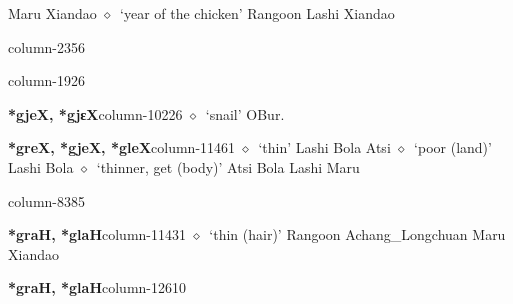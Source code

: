 \hspace{1ex}
         Maru 
\hspace{1ex}
         Xiandao 
\hspace{1ex}
         $\diamond$~`year of the chicken'
         Rangoon 
\hspace{1ex}
         Lashi 
\hspace{1ex}
         Xiandao 
  \item {\footnotesize \textbf{}}{\tiny column-2356}
  \item {\footnotesize \textbf{}}{\tiny column-1926}
  \item {\footnotesize \textbf{*gjeX, *gjɛX}}{\tiny column-10226}
         $\diamond$~`snail'
         OBur. 
  \item {\footnotesize \textbf{*greX, *gjeX, *gleX}}{\tiny column-11461}
         $\diamond$~`thin'
         Lashi 
\hspace{1ex}
         Bola 
\hspace{1ex}
         Atsi 
\hspace{1ex}
         $\diamond$~`poor (land)'
         Lashi 
\hspace{1ex}
         Bola 
\hspace{1ex}
         $\diamond$~`thinner, get (body)'
         Atsi 
\hspace{1ex}
         Bola 
\hspace{1ex}
         Lashi 
\hspace{1ex}
         Maru 
  \item {\footnotesize \textbf{}}{\tiny column-8385}
  \item {\footnotesize \textbf{*graH, *glaH}}{\tiny column-11431}
         $\diamond$~`thin (hair)'
         Rangoon 
\hspace{1ex}
         Achang\_Longchuan 
\hspace{1ex}
         Maru 
\hspace{1ex}
         Xiandao 
  \item {\footnotesize \textbf{*graH, *glaH}}{\tiny column-12610}
